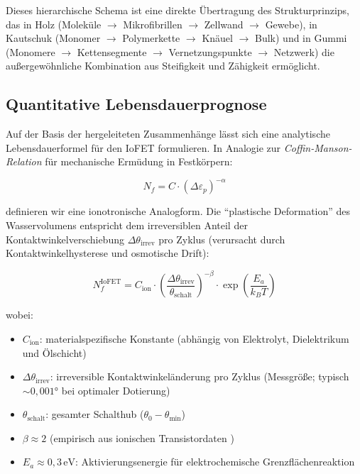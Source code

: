 ﻿\documentclass[a4paper,12pt]{scrreprt}
\theoremstyle{definition}
\begin{document}
Dieses hierarchische Schema ist eine direkte Übertragung des Strukturprinzips,
das in Holz (Moleküle $\to$ Mikrofibrillen $\to$ Zellwand $\to$ Gewebe),
in Kautschuk (Monomer $\to$ Polymerkette $\to$ Knäuel $\to$ Bulk) und in
Gummi (Monomere $\to$ Kettensegmente $\to$ Vernetzungspunkte $\to$ Netzwerk)
die außergewöhnliche Kombination aus Steifigkeit und Zähigkeit ermöglicht.

\subsection{Quantitative Lebensdauerprognose}

Auf der Basis der hergeleiteten Zusammenhänge lässt sich eine analytische
Lebensdauerformel für den IoFET formulieren. In Analogie zur
\emph{Coffin-Manson-Relation} für mechanische Ermüdung in Festkörpern:

\begin{equation}
	N_f = C \cdot \left(\Delta \varepsilon_p\right)^{-\alpha}
	\label{eq:coffin_manson}
\end{equation}

definieren wir eine ionotronische Analogform. Die ``plastische Deformation''
des Wasservolumens entspricht dem irreversiblen Anteil der Kontaktwinkelverschiebung
$\Delta\theta_{\mathrm{irrev}}$ pro Zyklus (verursacht durch Kontaktwinkelhysterese
und osmotische Drift):

\begin{equation}
	\boxed{N_f^{\mathrm{IoFET}} = C_{\mathrm{ion}} \cdot
		\left(\frac{\Delta\theta_{\mathrm{irrev}}}{\theta_{\mathrm{schalt}}}\right)^{-\beta}
		\cdot \exp\!\left(\frac{E_a}{k_B T}\right)}
	\label{eq:lebensdauer_iofet}
\end{equation}

wobei:
\begin{itemize}
	\item $C_{\mathrm{ion}}$: materialspezifische Konstante (abhängig von
	Elektrolyt, Dielektrikum und Ölschicht)
	\item $\Delta\theta_{\mathrm{irrev}}$: irreversible Kontaktwinkeländerung
	pro Zyklus (Messgröße; typisch $\sim 0{,}001 °$ bei optimaler Dotierung)
	\item $\theta_{\mathrm{schalt}}$: gesamter Schalthub ($\theta_0 - \theta_{\mathrm{min}}$)
	\item $\beta \approx 2$ (empirisch aus ionischen Transistordaten \cite{xu2021})
	\item $E_a \approx 0{,}3\,\mathrm{eV}$: Aktivierungsenergie für
	elektrochemische Grenzflächenreaktion
\end{itemize}
\end{document}
